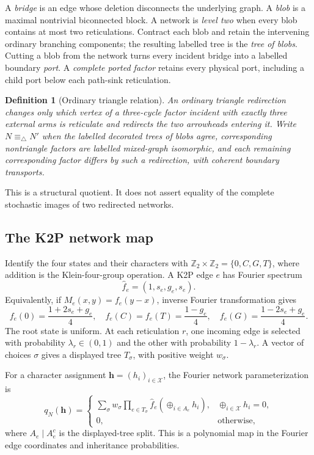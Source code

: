 \documentclass[11pt]{article}
\newtheorem{definition}[theorem]{Definition}
\theoremstyle{remark}
\newcommand{\G}{\mathbb Z_2\times\mathbb Z_2}
\newcommand{\X}{\mathcal X}
\newcommand{\trianglerel}{\equiv_\triangle}
\newcommand{\1}{\mathbf 1}
\newcommand{\xor}{\mathbin\oplus}
\begin{document}
A \emph{bridge} is an edge whose deletion disconnects the underlying graph.
A \emph{blob} is a maximal nontrivial biconnected block.  A network is
\emph{level two} when every blob contains at most two reticulations.  Contract
each blob and retain the intervening ordinary branching components; the
resulting labelled tree is the \emph{tree of blobs}.  Cutting a blob from the
network turns every incident bridge into a labelled boundary \emph{port}.  A
\emph{complete ported factor} retains every physical port, including a child
port below each path-sink reticulation.

\begin{definition}[Ordinary triangle relation]\label{def:triangle}
An ordinary triangle redirection changes only which vertex of a three-cycle
factor incident with exactly three external arms is reticulate and redirects
the two arrowheads entering it.  Write \(N\trianglerel N'\) when the labelled
decorated trees of blobs agree, corresponding nontriangle factors are
labelled mixed-graph isomorphic, and each remaining corresponding factor
differs by such a redirection, with coherent boundary transports.
\end{definition}

This is a structural quotient.  It does not assert equality of the complete
stochastic images of two redirected networks.

\subsection{The K2P network map}

Identify the four states and their characters with
\(\G=\{0,C,G,T\}\), where addition is the Klein-four-group operation.  A K2P
edge \(e\) has Fourier spectrum
\[
 \widehat f_e=(1,s_e,g_e,s_e).
\]
Equivalently, if \(M_e(x,y)=f_e(y-x)\), inverse Fourier transformation gives
\begin{equation}\label{eq:inverse-fourier}
 f_e(0)=\frac{1+2s_e+g_e}{4},\quad
 f_e(C)=f_e(T)=\frac{1-g_e}{4},\quad
 f_e(G)=\frac{1-2s_e+g_e}{4}.
\end{equation}
The root state is uniform.  At each reticulation \(r\), one incoming edge is
selected with probability \(\lambda_r\in(0,1)\) and the other with probability
\(1-\lambda_r\).  A vector of choices \(\sigma\) gives a displayed tree
\(T_\sigma\), with positive weight \(w_\sigma\).

For a character assignment \(\mathbf h=(h_i)_{i\in\X}\), the Fourier
network parameterization is
\begin{equation}\label{eq:k2p-fourier}
 q_N(\mathbf h)=
 \begin{cases}
 \displaystyle
 \sum_\sigma w_\sigma
 \prod_{e\in T_\sigma}
 \widehat f_e\!\left(\xor_{i\in A_e}h_i\right),
 &\xor_{i\in\X}h_i=0,\\[2mm]
 0,&\text{otherwise},
 \end{cases}
\end{equation}
where \(A_e\mid A_e^c\) is the displayed-tree split.  This is a polynomial
map in the Fourier edge coordinates and inheritance probabilities.
\end{document}
